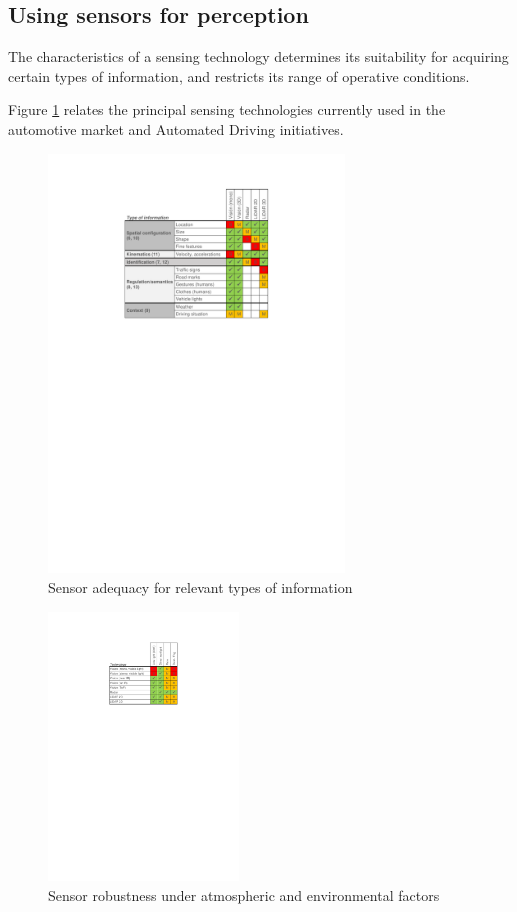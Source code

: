 \subsection{Using sensors for perception}

The characteristics of a sensing technology determines its suitability for 
acquiring certain types of information, and restricts its range of operative 
conditions.

Figure \ref{fig:information_vs_sensors} relates the principal sensing 
technologies currently used in the automotive market and Automated Driving
initiatives.

\begin{figure}[h]
    \centering
    \includegraphics[width=0.7\textwidth]{"img/information_types_sensors"}
    \caption{Sensor adequacy for relevant types of information}
    \label{fig:information_vs_sensors}
\end{figure}

\begin{figure}[h]
    \centering
    \includegraphics[width=0.45\textwidth]{"img/sensors_atmospheric_conditions"}
    \caption{Sensor robustness under atmospheric and environmental factors}
    \label{fig:radar-freqband}
\end{figure}


